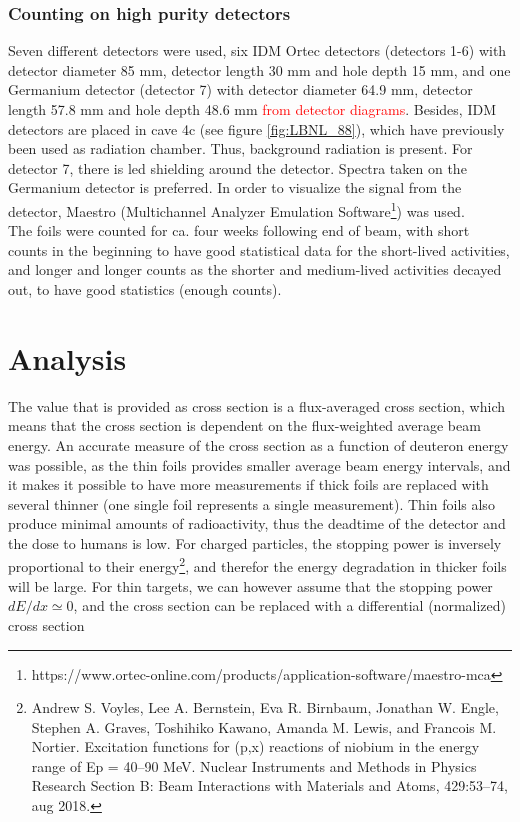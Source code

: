 \documentclass[a4paper,11pt,twoside]{book}
\begin{document}
\subsection{Counting on high purity detectors}

\noindent 
Seven different detectors were used, six IDM Ortec detectors (detectors 1-6) with detector diameter 85 mm, detector length 30 mm and hole depth 15 mm, and one Germanium detector (detector 7) with detector diameter 64.9 mm, detector length 57.8 mm and hole depth 48.6 mm \textcolor{red}{from detector diagrams}. Besides, IDM detectors are placed in cave 4c (see figure \ref{fig:LBNL_88}), which have previously been used as radiation chamber. Thus, background radiation is present. For detector 7, there is led shielding around the detector. Spectra taken on the Germanium detector is preferred. In order to visualize the signal from the detector, Maestro  (Multichannel Analyzer Emulation Software\footnote{https://www.ortec-online.com/products/application-software/maestro-mca}) was used. \\ 

\noindent 
The foils were counted for ca. four weeks following end of beam, with short counts in the beginning to have good statistical data for the short-lived activities, and longer and longer counts as the shorter and medium-lived activities decayed out, to have good statistics (enough counts).   


\chapter{Analysis}

The value that is provided as cross section is a flux-averaged cross section, which means that the cross section is dependent on the flux-weighted average beam energy. An accurate measure of the cross section as a function of deuteron energy was possible, as the thin foils provides smaller average beam energy intervals, and it makes it possible to have more measurements if thick foils are replaced with several thinner (one single foil represents a single measurement). Thin foils also produce minimal amounts of radioactivity, thus the deadtime of the detector and the dose to humans is low. For charged particles, the stopping power is inversely proportional to their energy\footnote{Andrew S. Voyles, Lee A. Bernstein, Eva R. Birnbaum, Jonathan W. Engle, Stephen A.
Graves, Toshihiko Kawano, Amanda M. Lewis, and Francois M. Nortier. Excitation functions
for (p,x) reactions of niobium in the energy range of Ep = 40–90 MeV. Nuclear Instruments
and Methods in Physics Research Section B: Beam Interactions with Materials and Atoms,
429:53–74, aug 2018.}, and therefor the energy degradation in thicker foils will be large. For thin targets, we can however assume that the stopping power $dE/dx\simeq 0$, and the cross section can be replaced with a differential (normalized) cross section 
\end{document}
